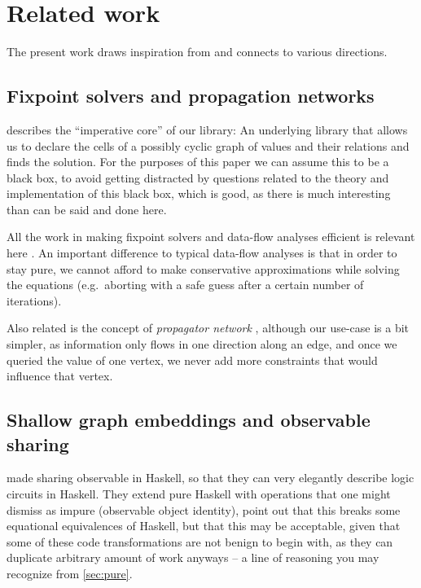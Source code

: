\documentclass[manuscript,anonymous,screen,acmsmall]{acmart}
\begin{document}
\section{Related work}\label{sec:related}

The present work draws inspiration from and connects to various directions.

\subsection{Fixpoint solvers and propagation networks}

 describes the “imperative core” of our library: An underlying library that allows us to declare the cells of a possibly cyclic graph of values and their relations and finds the solution. For the purposes of this paper we can assume this to be a black box, to avoid getting distracted by questions related to the theory and implementation of this black box, which is good, as there is much interesting than can be said and done here.

All the work in making fixpoint solvers and data-flow analyses efficient is relevant here \citep{kildall-73,kam-ullman-76}. An important difference to typical data-flow analyses is that in order to stay pure, we cannot afford to make conservative approximations while solving the equations (e.g.\ aborting with a safe guess after a certain number of iterations).

Also related is the concept of \emph{propagator network} \citep{propagator}, although our use-case is a bit simpler, as information only flows in one direction along an edge, and once we queried the value of one vertex, we never add more constraints that would influence that vertex.

%

\subsection{Shallow graph embeddings and observable sharing}

 made sharing observable in Haskell, so that they can very elegantly describe logic circuits in Haskell. They extend pure Haskell with operations that one might dismiss as impure (observable object identity), point out that this breaks some equational equivalences of Haskell, but that this may be acceptable, given that some of these code transformations are not benign to begin with, as they can duplicate arbitrary amount of work anyways -- a line of reasoning you may recognize from \cref{sec:pure}.
\end{document}
